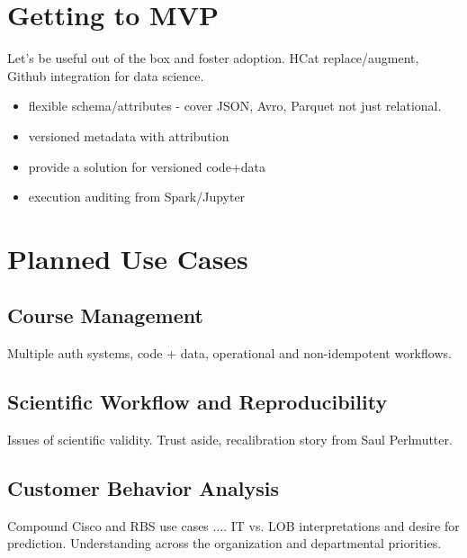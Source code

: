 \documentclass[10pt,letterpaper]{article}
\begin{document}
\section{Getting to MVP}
\label{sec:initialuse}

Let's be useful out of the box and foster adoption.
HCat replace/augment, Github integration for data science.
\begin{itemize}
\item flexible schema/attributes - cover JSON, Avro, Parquet not just relational.
\item versioned metadata with attribution
\item provide a solution for versioned code+data
\item execution auditing from Spark/Jupyter
\end{itemize}

\section{Planned Use Cases}
\subsection{Course Management}
Multiple auth systems, code + data, operational and non-idempotent workflows.

\subsection{Scientific Workflow and Reproducibility}
Issues of scientific validity.  Trust aside, recalibration story from Saul Perlmutter.

\subsection{Customer Behavior Analysis}
Compound Cisco and RBS use cases .... IT vs. LOB interpretations and desire for prediction.  Understanding across the organization and departmental priorities.



\end{document}
